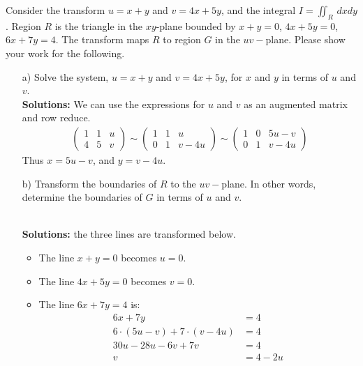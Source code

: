 \ifnum {}
    \question[6] Consider the transform $u=x+y$ and $v=4x+5y$, and the integral $\displaystyle I = \iint_{R}  \,dxdy$. Region $R$ is the triangle in the $xy$-plane bounded by $x+y=0$, $4x+5y=0$, $6x+7y=4$. The transform maps $R$ to region $G$ in the $uv-$plane.  Please show your work for the following.

    \begin{enumerate}
        \item[a)] Solve the system, $u=x+y$ and $v=4x+5y$, for $x$ and $y$ in terms of $u$ and $v$.
            \ifnum {} {\color{DarkBlue} \\[12pt] 
            \textbf{Solutions:}
            We can use the expressions for $u$ and $v$ as an augmented matrix and row reduce. 
            \begin{align}
                \begin{pmatrix} 1 & 1 & u \\ 4 & 5 & v\end{pmatrix} 
                \sim \begin{pmatrix} 1 & 1 & u \\0 & 1 & v - 4u \end{pmatrix} 
                \sim \begin{pmatrix} 1 & 0 & 5u - v \\ 0 & 1 & v - 4u \end{pmatrix} 
            \end{align}
            Thus $x = 5u - v$, and $y = v - 4u$. 
            } 
            \else 
            \vspace{5cm}
            \fi
        \item[b)] Transform the boundaries of $R$ to the $uv-$plane. In other words, determine the boundaries of $G$ in terms of $u$ and $v$. 
            \ifnum {} {\color{DarkBlue} \\[12pt] 
            \textbf{Solutions:} the three lines are transformed below. 
            \begin{itemize}
                \item The line $x+y=0$ becomes $u=0$. 
                \item The line $4x+5y=0$ becomes $v=0$. 
                \item The line $6x+7y=4$ is: 
                \begin{align}
                    6x+7y &=4 \\
                    6\cdot(5u-v) + 7\cdot(v-4u) &= 4\\
                    30u -28u -6v+7v &=4 \\
                    v &= 4 -2u
                \end{align}
            \end{itemize}
            } 
        \else 
        \vspace{5cm}
        \fi        
            

\end{enumerate}
